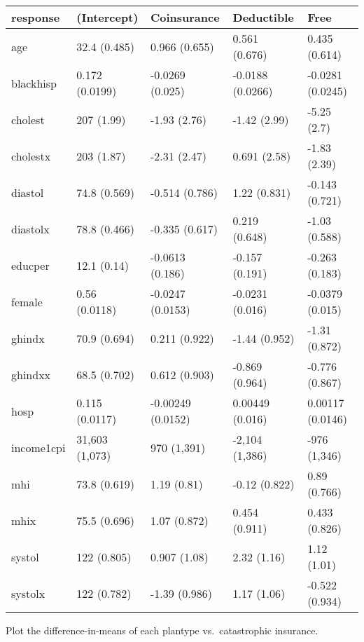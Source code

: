 \documentclass[]{book}
\theoremstyle{definition}
\theoremstyle{definition}
\theoremstyle{definition}
\theoremstyle{remark}
\begin{document}
\begin{tabular}{l|l|l|l|l}
\hline
response & (Intercept) & Coinsurance & Deductible & Free\\
\hline
age & 32.4 (0.485) & 0.966 (0.655) & 0.561 (0.676) & 0.435 (0.614)\\
\hline
blackhisp & 0.172 (0.0199) & -0.0269 (0.025) & -0.0188 (0.0266) & -0.0281 (0.0245)\\
\hline
cholest & 207 (1.99) & -1.93 (2.76) & -1.42 (2.99) & -5.25 (2.7)\\
\hline
cholestx & 203 (1.87) & -2.31 (2.47) & 0.691 (2.58) & -1.83 (2.39)\\
\hline
diastol & 74.8 (0.569) & -0.514 (0.786) & 1.22 (0.831) & -0.143 (0.721)\\
\hline
diastolx & 78.8 (0.466) & -0.335 (0.617) & 0.219 (0.648) & -1.03 (0.588)\\
\hline
educper & 12.1 (0.14) & -0.0613 (0.186) & -0.157 (0.191) & -0.263 (0.183)\\
\hline
female & 0.56 (0.0118) & -0.0247 (0.0153) & -0.0231 (0.016) & -0.0379 (0.015)\\
\hline
ghindx & 70.9 (0.694) & 0.211 (0.922) & -1.44 (0.952) & -1.31 (0.872)\\
\hline
ghindxx & 68.5 (0.702) & 0.612 (0.903) & -0.869 (0.964) & -0.776 (0.867)\\
\hline
hosp & 0.115 (0.0117) & -0.00249 (0.0152) & 0.00449 (0.016) & 0.00117 (0.0146)\\
\hline
income1cpi & 31,603 (1,073) & 970 (1,391) & -2,104 (1,386) & -976 (1,346)\\
\hline
mhi & 73.8 (0.619) & 1.19 (0.81) & -0.12 (0.822) & 0.89 (0.766)\\
\hline
mhix & 75.5 (0.696) & 1.07 (0.872) & 0.454 (0.911) & 0.433 (0.826)\\
\hline
systol & 122 (0.805) & 0.907 (1.08) & 2.32 (1.16) & 1.12 (1.01)\\
\hline
systolx & 122 (0.782) & -1.39 (0.986) & 1.17 (1.06) & -0.522 (0.934)\\
\hline
\end{tabular}

Plot the difference-in-means of each plantype vs.~catastrophic
insurance.
\end{document}
